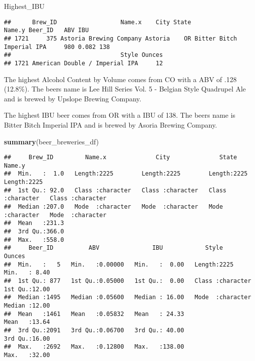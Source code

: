 \documentclass[
]{article}
\newenvironment{Shaded}{\begin{snugshade}}{\end{snugshade}}
\newcommand{\KeywordTok}[1]{\textcolor[rgb]{0.13,0.29,0.53}{\textbf{#1}}}
\newcommand{\NormalTok}[1]{#1}
\begin{document}
\begin{Shaded}
\begin{Highlighting}[]
\NormalTok{Highest_IBU}
\end{Highlighting}
\end{Shaded}

\begin{verbatim}
##      Brew_ID                  Name.x    City State                    Name.y Beer_ID   ABV IBU
## 1721     375 Astoria Brewing Company Astoria    OR Bitter Bitch Imperial IPA     980 0.082 138
##                               Style Ounces
## 1721 American Double / Imperial IPA     12
\end{verbatim}

The highest Alcohol Content by Volume comes from CO with a ABV of .128
(12.8\%). The beers name is Lee Hill Series Vol. 5 - Belgian Style
Quadrupel Ale and is brewed by Upslope Brewing Company.

The highest IBU beer comes from OR with a IBU of 138. The beers name is
Bitter Bitch Imperial IPA and is brewed by Asoria Brewing Company.

\begin{Shaded}
\begin{Highlighting}[]
\KeywordTok{summary}\NormalTok{(beer_breweries_df)}
\end{Highlighting}
\end{Shaded}

\begin{verbatim}
##     Brew_ID         Name.x              City              State              Name.y         
##  Min.   :  1.0   Length:2225        Length:2225        Length:2225        Length:2225       
##  1st Qu.: 92.0   Class :character   Class :character   Class :character   Class :character  
##  Median :207.0   Mode  :character   Mode  :character   Mode  :character   Mode  :character  
##  Mean   :231.3                                                                              
##  3rd Qu.:366.0                                                                              
##  Max.   :558.0                                                                              
##     Beer_ID          ABV               IBU            Style               Ounces     
##  Min.   :   5   Min.   :0.00000   Min.   :  0.00   Length:2225        Min.   : 8.40  
##  1st Qu.: 877   1st Qu.:0.05000   1st Qu.:  0.00   Class :character   1st Qu.:12.00  
##  Median :1495   Median :0.05600   Median : 16.00   Mode  :character   Median :12.00  
##  Mean   :1461   Mean   :0.05832   Mean   : 24.33                      Mean   :13.64  
##  3rd Qu.:2091   3rd Qu.:0.06700   3rd Qu.: 40.00                      3rd Qu.:16.00  
##  Max.   :2692   Max.   :0.12800   Max.   :138.00                      Max.   :32.00
\end{verbatim}
\end{document}
